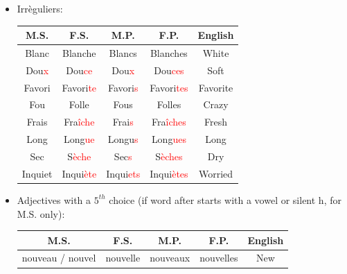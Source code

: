 \documentclass{book}
\begin{document}
\begin{itemize}
\begin{center}
            \end{center}
        \item Irrèguliers:
            \begin{center}
                \begin{tabular}{|c|c|c|c|c|}
                    \hline
                    \textbf{M.S.} & \textbf{F.S.} & \textbf{M.P.} & \textbf{F.P.} & \textbf{English} \\
                    \hline
                    Blanc & Blanche & Blancs & Blanches & White \\
                    \hline
                    Dou\textcolor{red}{x} & Dou\textcolor{red}{ce} & Dou\textcolor{red}{x} & Dou\textcolor{red}{ces} & Soft \\
                    \hline
                    Favori & Favori\textcolor{red}{te} & Favori\textcolor{red}{s} & Favori\textcolor{red}{tes} & Favorite \\
                    \hline
                    Fou & Folle & Fous & Folles & Crazy \\
                    \hline
                    Frais & Fra\textcolor{red}{îche} & Frai\textcolor{red}{s} & Fra\textcolor{red}{îches} & Fresh \\
                    \hline
                    Long & Long\textcolor{red}{ue} & Longu\textcolor{red}{s} & Long\textcolor{red}{ues} & Long \\
                    \hline
                    Sec & S\textcolor{red}{èche} & Sec\textcolor{red}{s} & S\textcolor{red}{èches} & Dry \\
                    \hline
                    Inquiet & Inqui\textcolor{red}{ète} & Inqui\textcolor{red}{ets} & Inqui\textcolor{red}{ètes} & Worried \\
                    \hline
                \end{tabular}
            \end{center}
        \item Adjectives with a $5^{th}$ choice (if word after starts with a vowel or silent h, for M.S. only):
            \begin{center}
                \begin{tabular}{|c|c|c|c|c|}
                    \hline
                    \textbf{M.S.} & \textbf{F.S.} & \textbf{M.P.} & \textbf{F.P.} & \textbf{English} \\
                    \hline
                    nouveau / nouvel & nouvelle & nouveaux & nouvelles & New \\

\end{tabular}
\end{center}
\end{itemize}
\end{document}
